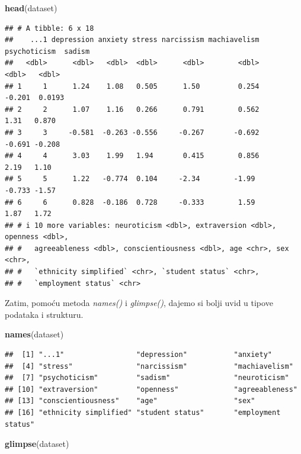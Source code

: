 \documentclass[
]{article}
\newenvironment{Shaded}{\begin{snugshade}}{\end{snugshade}}
\newcommand{\FunctionTok}[1]{\textcolor[rgb]{0.13,0.29,0.53}{\textbf{#1}}}
\newcommand{\NormalTok}[1]{#1}
\begin{document}
\begin{Shaded}
\begin{Highlighting}[]
\FunctionTok{head}\NormalTok{(dataset)}
\end{Highlighting}
\end{Shaded}

\begin{verbatim}
## # A tibble: 6 x 18
##    ...1 depression anxiety stress narcissism machiavelism psychoticism  sadism
##   <dbl>      <dbl>   <dbl>  <dbl>      <dbl>        <dbl>        <dbl>   <dbl>
## 1     1      1.24    1.08   0.505      1.50         0.254       -0.201  0.0193
## 2     2      1.07    1.16   0.266      0.791        0.562        1.31   0.870 
## 3     3     -0.581  -0.263 -0.556     -0.267       -0.692       -0.691 -0.208 
## 4     4      3.03    1.99   1.94       0.415        0.856        2.19   1.10  
## 5     5      1.22   -0.774  0.104     -2.34        -1.99        -0.733 -1.57  
## 6     6      0.828  -0.186  0.728     -0.333        1.59         1.87   1.72  
## # i 10 more variables: neuroticism <dbl>, extraversion <dbl>, openness <dbl>,
## #   agreeableness <dbl>, conscientiousness <dbl>, age <chr>, sex <chr>,
## #   `ethnicity simplified` <chr>, `student status` <chr>,
## #   `employment status` <chr>
\end{verbatim}

Zatim, pomoću metoda \emph{names()} i \emph{glimpse()}, dajemo si bolji
uvid u tipove podataka i strukturu.

\begin{Shaded}
\begin{Highlighting}[]
\FunctionTok{names}\NormalTok{(dataset)}
\end{Highlighting}
\end{Shaded}

\begin{verbatim}
##  [1] "...1"                 "depression"           "anxiety"             
##  [4] "stress"               "narcissism"           "machiavelism"        
##  [7] "psychoticism"         "sadism"               "neuroticism"         
## [10] "extraversion"         "openness"             "agreeableness"       
## [13] "conscientiousness"    "age"                  "sex"                 
## [16] "ethnicity simplified" "student status"       "employment status"
\end{verbatim}

\begin{Shaded}
\begin{Highlighting}[]
\FunctionTok{glimpse}\NormalTok{(dataset)}
\end{Highlighting}
\end{Shaded}
\end{document}
